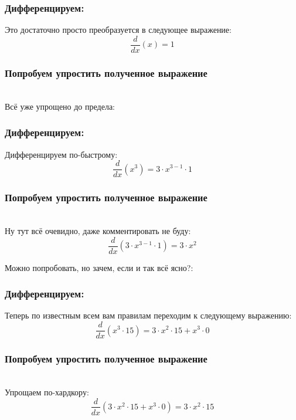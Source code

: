 \documentclass[a4paper,12pt]{article}
\begin{document}
\subsubsection*{Дифференцируем:}

Это достаточно просто преобразуется в следующее выражение:
\begin{dmath}\frac{d}{dx}\left(x\right)=1\end{dmath}
\subsubsection*{Попробуем упростить полученное выражение}
\\Всё уже упрощено до предела:

\subsubsection*{Дифференцируем:}

Дифференцируем по-быстрому:
\begin{dmath}\frac{d}{dx}\left(x^{3}\right)=3\cdot x^{3- 1}\cdot 1\end{dmath}
\subsubsection*{Попробуем упростить полученное выражение}
\\Ну тут всё очевидно, даже комментировать не буду:\\
\begin{dmath}
	\frac{d}{dx}\left(3\cdot x^{3- 1}\cdot 1\right) = 3\cdot x^{2}\end{dmath}

Можно попробовать, но зачем, если и так всё ясно?:

\subsubsection*{Дифференцируем:}

Теперь по известным всем вам правилам переходим к следующему выражению:
\begin{dmath}\frac{d}{dx}\left(x^{3}\cdot 15\right)=3\cdot x^{2}\cdot 15+ x^{3}\cdot 0\end{dmath}
\subsubsection*{Попробуем упростить полученное выражение}
\\Упрощаем по-хардкору:\\
\begin{dmath}
	\frac{d}{dx}\left(3\cdot x^{2}\cdot 15+ x^{3}\cdot 0\right) = 3\cdot x^{2}\cdot 15\end{dmath}
\end{document}
